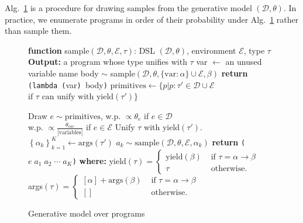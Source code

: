 \documentclass{article}
\newcommand{\code}[1]{{\footnotesize\texttt{#1}}}
\begin{document}
Alg.~\ref{programGenerativeModel} is a procedure for drawing
samples from the generative model $(\mathcal{D},\theta)$.  In practice, we
enumerate programs in order of their probability under  Alg.~\ref{programGenerativeModel} rather than sample them.

\begin{figure}
  \centering
  \begin{minipage}{0.5\textwidth}    
    \begin{algorithm}[H]
       \caption{Generative model over programs}
       \label{programGenerativeModel}
       \begin{algorithmic}
         \STATE \textbf{function} sample$(\mathcal{D}, \theta, \mathcal{E}, \tau)$:
       DSL $(\mathcal{D},\theta)$, environment $\mathcal{E}$, type $\tau$
      \STATE \textbf{Output:} a program whose type unifies with $\tau$
      \IF{$\tau = \alpha\to\beta$}
      \STATE var $\gets$ an unused variable name
      \STATE body $\sim$ sample$(\mathcal{D},\theta,\{\text{var}:\alpha\}\cup\mathcal{E},\beta)$
       \STATE \textbf{return} \code{(lambda (}var\code{) }body\code{)}
       \ENDIF
       \STATE $\text{primitives} \gets\{p | p: \tau' \in \mathcal{D}\cup\mathcal{E}$ \\
          \hspace*{6.9em}$\text{if }\tau\text{ can unify with yield}(\tau') \} $
       
       \STATE Draw $e\sim \text{primitives}$, w.p. $\propto\theta_e$ if $e\in \mathcal{D}$ \\
          \hspace*{8.8em}w.p. $\propto\frac{\theta_{var}}{|\text{variables}|}$ if $e\in \mathcal{E}$
       \STATE Unify $\tau$ with yield$(\tau')$.
       \STATE $\left\{\alpha_k \right\}_{k = 1}^K\gets\text{args}(\tau')$ 
     \STATE $a_k\sim\text{sample}(\mathcal{D},\theta,\mathcal{E},\alpha_k)$
     \ENDFOR
     \STATE \textbf{return} \code{(}$e\;a_1\; a_2\; \cdots\; a_K$\code{)}
     \STATE\textbf{where:}
     \STATE yield$(\tau) = \begin{cases}
       \text{yield}(\beta)   &\text{ if }\tau = \alpha\to \beta\\
       \tau   &\text{ otherwise.}
     \end{cases}$ 
     \STATE  args$(\tau) = \begin{cases}
       [\alpha] + \text{args}(\beta)   &\text{ if }\tau = \alpha\to \beta\\
       []   &\text{ otherwise.}
     \end{cases}$
    \end{algorithmic}
    \end{algorithm}
  \end{minipage}
\end{figure}
\end{document}
